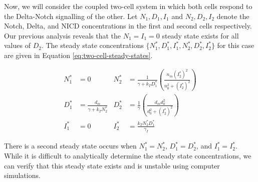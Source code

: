 \documentclass{article}
\begin{document}
\begin{flushleft}
Now, we will consider the coupled two-cell system in which both cells respond to the Delta-Notch signalling of the other. Let $N_{1}, D_{1}, I_{1}$ and $N_{2}, D_{2}, I_{2}$ denote the Notch, Delta, and NICD concentrations in the first and second cells respectively. Our previous analysis reveals that the $N_{1} = I_{1} = 0$ steady state exists for all values of $D_{2}$. The steady state concentrations $\{ N_{1}^{*}, D_{1}^{*}, I_{1}^{*}, N_{2}^{*}, D_{2}^{*}, I_{2}^{*} \}$ for this case are given in Equation \ref{eq:two-cell-steady-states}.

\begin{equation}
\label{eq:two-cell-steady-states}
\begin{aligned}
  N_{1}^{*} &= 0  &
  N_{2}^{*} &= \frac{1}{\gamma + k_{T}D_{1}^{*}}\left( \frac{n_{m}(I_{2}^{*})^2}{n_{0}^2 + (I_{2}^{*})^2} \right)  \\[5pt]
  D_{1}^{*} &= \frac{d_{m}}{\gamma + k_{T}N_{2}^{*}} &
  D_{2}^{*} &= \frac{1}{\gamma} \left( \frac{d_{m}d_{0}^2}{d_{0}^2 + (I_{2}^{*})^2} \right)  \\[5pt]
  I_{1}^{*} &= 0 &
  I_{2}^{*} &= \frac{k_{T}N_{2}^{*}D_{1}^{*}}{\gamma_{I}}
\end{aligned}
\end{equation}

There is a second steady state occurs when $N_{1}^{*} = N_{2}^{*}$, $D_{1}^{*} = D_{2}^{*}$, and $I_{1}^{*} = I_{2}^{*}$. While it is difficult to analytically determine the steady state concentrations, we can verify that this steady state exists and is unstable using computer simulations.

\end{flushleft}
\end{document}
